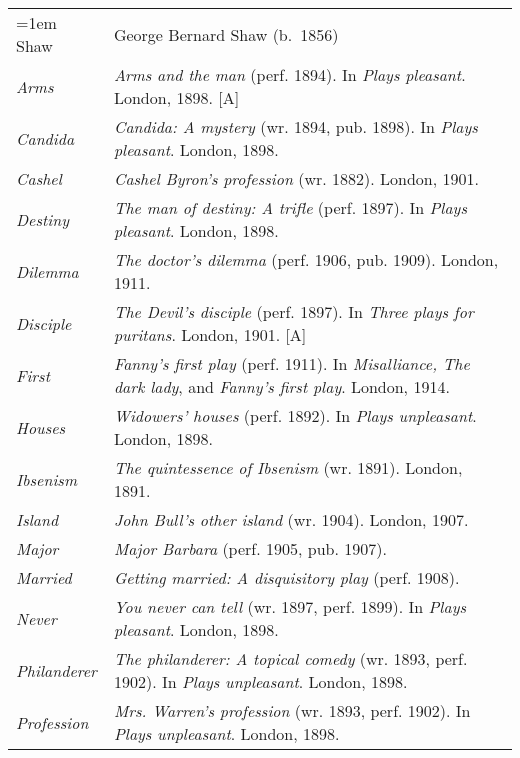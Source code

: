 \begin{xltabular}{\textwidth}{ lQ }
\hangindent=1em  Shaw & George Bernard Shaw (b.~1856) \\
\hspace{1em}\textit{Arms} & \textit{Arms and the man} (perf. 1894). In \textit{Plays pleasant}. London, 1898. [A] \\ 
\hspace{1em}\textit{Candida} & \textit{Candida: A mystery} (wr. 1894, pub. 1898). In \textit{Plays pleasant}. London, 1898. \\ 
\hspace{1em}\textit{Cashel} & \textit{Cashel Byron's profession} (wr. 1882). London, 1901. \\ 
\hspace{1em}\textit{Destiny} & \textit{The man of destiny: A trifle} (perf. 1897). In \textit{Plays pleasant}. London, 1898. \\
\hspace{1em}\textit{Dilemma} & \textit{The doctor's dilemma} (perf. 1906, pub. 1909). London, 1911. \\ 
\hspace{1em}\textit{Disciple} & \textit{The Devil's disciple} (perf. 1897). In \textit{Three plays for puritans}. London, 1901. [A] \\ 
\hspace{1em}\textit{First} & \textit{Fanny's first play} (perf. 1911). In \textit{Misalliance, The dark lady}, and \textit{Fanny's first play}. London, 1914. \\ 
\hspace{1em}\textit{Houses} & \textit{Widowers' houses} (perf. 1892). In \textit{Plays unpleasant}. London, 1898. \\ 
\hspace{1em}\textit{Ibsenism} & \textit{The quintessence of Ibsenism} (wr. 1891). London, 1891. \\ 
\hspace{1em}\textit{Island} & \textit{John Bull's other island} (wr. 1904). London, 1907. \\ 
\hspace{1em}\textit{Major} & \textit{Major Barbara} (perf. 1905, pub. 1907). \\ 
\hspace{1em}\textit{Married} & \textit{Getting married: A disquisitory play} (perf. 1908). \\
\hspace{1em}\textit{Never} & \textit{You never can tell} (wr. 1897, perf. 1899). In \textit{Plays pleasant}. London, 1898. \\ 
\hspace{1em}\textit{Philanderer} & \textit{The philanderer: A topical comedy} (wr. 1893, perf. 1902). In \textit{Plays unpleasant}. London, 1898. \\ 
\hspace{1em}\textit{Profession} & \textit{Mrs. Warren's profession}  (wr. 1893, perf. 1902). In \textit{Plays unpleasant}. London, 1898. \\


\end{xltabular}
